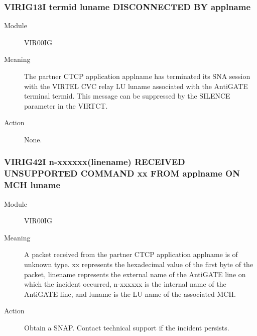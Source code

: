 \documentclass[letterpaper,10pt,english]{sphinxmanual}
\begin{document}
\subsubsection{VIRIG13I termid luname DISCONNECTED BY applname}
\label{\detokenize{messages:virig13i-termid-luname-disconnected-by-applname}}\begin{description}
\item[{Module}] \leavevmode
VIR00IG

\item[{Meaning}] \leavevmode
The partner CTCP application applname has terminated its SNA session with the VIRTEL CVC relay LU luname associated with the AntiGATE terminal termid. This message can be suppressed by the SILENCE parameter in the VIRTCT.

\item[{Action}] \leavevmode
None.

\end{description}


\subsubsection{VIRIG42I n-xxxxxx(linename) RECEIVED UNSUPPORTED COMMAND xx FROM applname ON MCH luname}
\label{\detokenize{messages:virig42i-n-xxxxxx-linename-received-unsupported-command-xx-from-applname-on-mch-luname}}\begin{description}
\item[{Module}] \leavevmode
VIR00IG

\item[{Meaning}] \leavevmode
A packet received from the partner CTCP application applname is of unknown type. xx represents the hexadecimal value of the first byte of the packet, linename represents the external name of the AntiGATE line on which the incident occurred, n-xxxxxx is the internal name of the AntiGATE line, and luname is the LU name of the associated MCH.

\item[{Action}] \leavevmode
Obtain a SNAP. Contact technical support if the incident persists.

\end{description}
\end{document}
